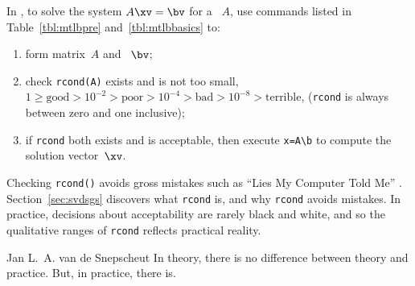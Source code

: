 \begin{procedure} \label{pro:unisol}
In \script, to solve the system \(A\xv=\bv\) for a ~\(A\), use commands listed in Table~\ref{tbl:mtlbpre} and~\ref{tbl:mtlbbasics} to:
\begin{enumerate}
\item form matrix~\(A\) and ~\(\bv\);
\item check \verb|rcond(A)| exists and is not too small, \(1\geq\text{good} >10^{-2} >\text{poor} >10^{-4} >\text{bad} >10^{-8} >\text{terrible}\), (\verb|rcond| is always between zero and one inclusive);
\item if \verb|rcond| both exists and is acceptable, then execute \verb|x=A\b| to compute the solution vector~\(\xv\). 
\end{enumerate}
\end{procedure}

Checking \verb|rcond()| avoids gross mistakes such as  ``Lies My Computer Told Me'' .
Section~\ref{sec:svdsgs} discovers what \verb|rcond| is, and why \verb|rcond| avoids mistakes.
In practice, decisions about acceptability are rarely black and white, and so the qualitative ranges of \verb|rcond| reflects practical reality.

\begin{quoted}{Jan L.~A. van de Snepscheut}
In theory, there is no difference between theory and practice. 
But, in practice, there is. 
\end{quoted}




